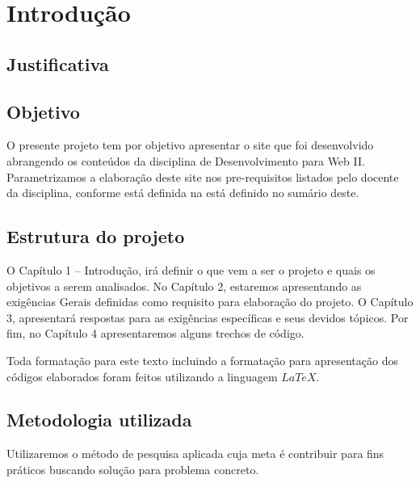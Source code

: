 \chapter{Introdução}

\section{Justificativa}
	
	

\section{Objetivo}

	O presente projeto tem por objetivo apresentar o site que foi desenvolvido abrangendo os conteúdos da disciplina de Desenvolvimento para Web II. Parametrizamos a elaboração deste site nos pre-requisitos listados pelo docente da disciplina, conforme está definida na está definido no sumário deste.

\section{Estrutura do projeto} 

	O Capítulo 1 – Introdução, irá definir o que vem a ser o projeto e quais os objetivos a serem analisados. No Capítulo 2, estaremos apresentando as exigências Gerais definidas como requisito para elaboração do projeto. O Capítulo 3, apresentará respostas para as exigências específicas e seus devidos tópicos. Por fim, no Capítulo 4 apresentaremos alguns trechos de código.
		
	Toda formatação para este texto incluindo a formatação para apresentação dos códigos elaborados foram feitos utilizando a linguagem $LaTeX$.


\section{ Metodologia utilizada}
	Utilizaremos o método de pesquisa aplicada cuja meta é contribuir para fins práticos buscando solução para problema concreto.


